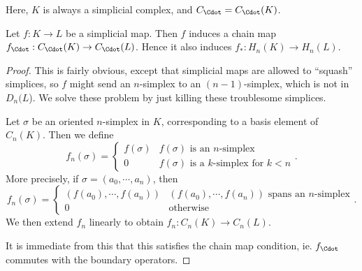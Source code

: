 \documentclass[a4paper]{article}
\begin{document}
Here, $K$ is always a simplicial complex, and $C_{\Cdot} = C_{\Cdot}(K)$.
\begin{lemma}
  Let $f: K \to L$ be a simplicial map. Then $f$ induces a chain map $f_{\Cdot}: C_{\Cdot}(K) \to C_{\Cdot}(L)$. Hence it also induces $f_*: H_n (K) \to H_n(L)$.
\end{lemma}

\begin{proof}
  This is fairly obvious, except that simplicial maps are allowed to ``squash'' simplices, so $f$ might send an $n$-simplex to an $(n - 1)$-simplex, which is not in $D_n(L$). We solve these problem by just killing these troublesome simplices.

  Let $\sigma$ be an oriented $n$-simplex in $K$, corresponding to a basis element of $C_n(K)$. Then we define
  \[
    f_n(\sigma) =
    \begin{cases}
      f(\sigma) & f(\sigma)\text{ is an $n$-simplex}\\
      0 & f(\sigma)\text{ is a $k$-simplex for }k < n
    \end{cases}.
  \]
  More precisely, if $\sigma = (a_0, \cdots, a_n)$, then
  \[
    f_n(\sigma) =
    \begin{cases}
      (f(a_0), \cdots, f(a_n)) & (f(a_0), \cdots, f(a_n))\text{ spans an $n$-simplex}\\
      0 & \text{otherwise}
    \end{cases}.
  \]
  We then extend $f_n$ linearly to obtain $f_n: C_n(K) \to C_n(L)$.

  It is immediate from this that this satisfies the chain map condition, ie. $f_{\Cdot}$ commutes with the boundary operators.
\end{proof}
\end{document}
